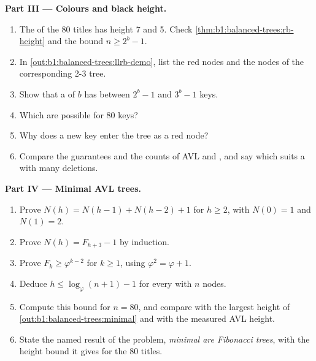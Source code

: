 \begin{problem}
\medskip\noindent\textbf{Part III --- Colours and black height.}
\begin{enumerate}[resume]
\item The  of the 80 titles has height 7 and  5. Check \cref{thm:b1:balanced-trees:rb-height}
and the bound $n \geq 2^b - 1$.
\item In \cref{out:b1:balanced-trees:llrb-demo}, list the red nodes and the nodes of the corresponding 2-3 tree.
\item Show that a  of  $b$ has between $2^b - 1$ and $3^b - 1$ keys.
\item Which  are possible for 80 keys?
\item Why does a new key enter the tree as a red node?
\item Compare the guarantees and the  counts of AVL and , and say which suits a  with
many deletions.
\end{enumerate}

\medskip\noindent\textbf{Part IV --- Minimal AVL trees.}
\begin{enumerate}[resume]
\item Prove $N(h) = N(h - 1) + N(h - 2) + 1$ for $h \geq 2$, with $N(0) = 1$ and $N(1) = 2$.
\item Prove $N(h) = F_{h+3} - 1$ by induction.
\item Prove $F_k \geq \varphi^{k-2}$ for $k \geq 1$, using $\varphi^2 = \varphi + 1$.
\item Deduce $h \leq \log_\varphi (n + 1) - 1$ for every  with $n$ nodes.
\item Compute this bound for $n = 80$, and compare with the largest height of \cref{out:b1:balanced-trees:minimal} and
with the measured AVL height.
\item State the named result of the problem, \emph{minimal  are Fibonacci trees}, with the height bound it
gives for the 80 titles.
\end{enumerate}
\end{problem}
